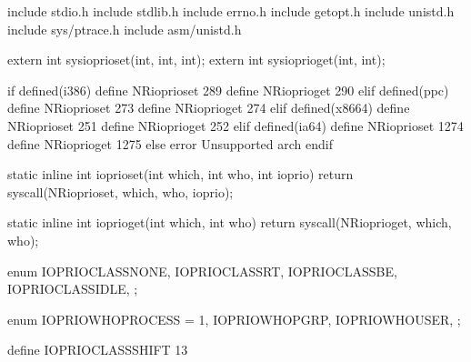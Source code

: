 \documentclass[a4paper,11pt,english]{sphinxmanual}
\begin{document}
\begin{sphinxVerbatim}[commandchars=\\\{\}]
\PYGZsh{}include \PYGZlt{}stdio.h\PYGZgt{}
\PYGZsh{}include \PYGZlt{}stdlib.h\PYGZgt{}
\PYGZsh{}include \PYGZlt{}errno.h\PYGZgt{}
\PYGZsh{}include \PYGZlt{}getopt.h\PYGZgt{}
\PYGZsh{}include \PYGZlt{}unistd.h\PYGZgt{}
\PYGZsh{}include \PYGZlt{}sys/ptrace.h\PYGZgt{}
\PYGZsh{}include \PYGZlt{}asm/unistd.h\PYGZgt{}

extern int sys\PYGZus{}ioprio\PYGZus{}set(int, int, int);
extern int sys\PYGZus{}ioprio\PYGZus{}get(int, int);

\PYGZsh{}if defined(\PYGZus{}\PYGZus{}i386\PYGZus{}\PYGZus{})
\PYGZsh{}define \PYGZus{}\PYGZus{}NR\PYGZus{}ioprio\PYGZus{}set               289
\PYGZsh{}define \PYGZus{}\PYGZus{}NR\PYGZus{}ioprio\PYGZus{}get               290
\PYGZsh{}elif defined(\PYGZus{}\PYGZus{}ppc\PYGZus{}\PYGZus{})
\PYGZsh{}define \PYGZus{}\PYGZus{}NR\PYGZus{}ioprio\PYGZus{}set               273
\PYGZsh{}define \PYGZus{}\PYGZus{}NR\PYGZus{}ioprio\PYGZus{}get               274
\PYGZsh{}elif defined(\PYGZus{}\PYGZus{}x86\PYGZus{}64\PYGZus{}\PYGZus{})
\PYGZsh{}define \PYGZus{}\PYGZus{}NR\PYGZus{}ioprio\PYGZus{}set               251
\PYGZsh{}define \PYGZus{}\PYGZus{}NR\PYGZus{}ioprio\PYGZus{}get               252
\PYGZsh{}elif defined(\PYGZus{}\PYGZus{}ia64\PYGZus{}\PYGZus{})
\PYGZsh{}define \PYGZus{}\PYGZus{}NR\PYGZus{}ioprio\PYGZus{}set               1274
\PYGZsh{}define \PYGZus{}\PYGZus{}NR\PYGZus{}ioprio\PYGZus{}get               1275
\PYGZsh{}else
\PYGZsh{}error \PYGZdq{}Unsupported arch\PYGZdq{}
\PYGZsh{}endif

static inline int ioprio\PYGZus{}set(int which, int who, int ioprio)
\PYGZob{}
      return syscall(\PYGZus{}\PYGZus{}NR\PYGZus{}ioprio\PYGZus{}set, which, who, ioprio);
\PYGZcb{}

static inline int ioprio\PYGZus{}get(int which, int who)
\PYGZob{}
      return syscall(\PYGZus{}\PYGZus{}NR\PYGZus{}ioprio\PYGZus{}get, which, who);
\PYGZcb{}

enum \PYGZob{}
      IOPRIO\PYGZus{}CLASS\PYGZus{}NONE,
      IOPRIO\PYGZus{}CLASS\PYGZus{}RT,
      IOPRIO\PYGZus{}CLASS\PYGZus{}BE,
      IOPRIO\PYGZus{}CLASS\PYGZus{}IDLE,
\PYGZcb{};

enum \PYGZob{}
      IOPRIO\PYGZus{}WHO\PYGZus{}PROCESS = 1,
      IOPRIO\PYGZus{}WHO\PYGZus{}PGRP,
      IOPRIO\PYGZus{}WHO\PYGZus{}USER,
\PYGZcb{};

\PYGZsh{}define IOPRIO\PYGZus{}CLASS\PYGZus{}SHIFT    13


\end{sphinxVerbatim}
\end{document}
